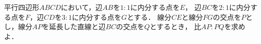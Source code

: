 \documentclass[../../main.tex]{subfiles}
\begin{document}
平行四辺形$ABCD$において，辺$AB$を$1:1$に内分する点を$E$，
辺$BC$を$2:1$に内分する点を$F$，辺$CD$を$3:1$に内分する点を$G$とする．
線分$CE$と線分$FG$の交点を$P$とし，線分$AP$を延長した直線と辺$BC$の交点を$Q$とするとき，
比$AP:PQ$を求めよ．
\end{document}
